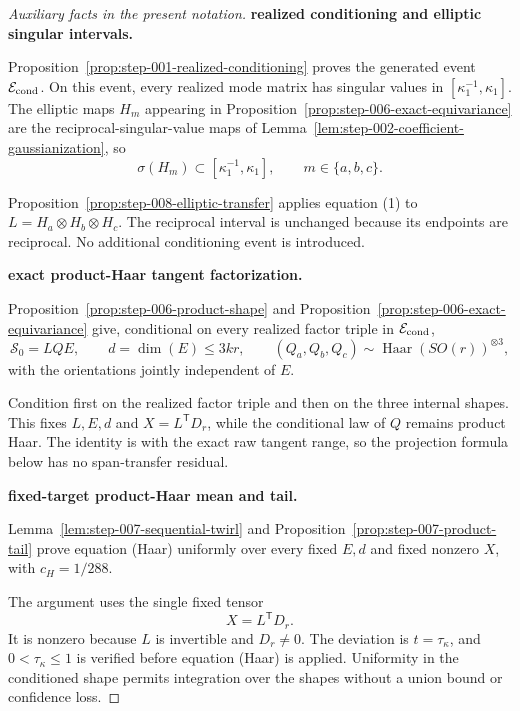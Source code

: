 \begin{proof}[Auxiliary facts in the present notation]


\medskip\noindent\textbf{realized conditioning and elliptic singular intervals.}\par

Proposition~\ref{prop:step-001-realized-conditioning} proves the generated
event \(\mathcal E_{\rm cond}\). On this event, every realized mode matrix has
singular values in \([\kappa_1^{-1},\kappa_1]\). The elliptic maps \(H_m\)
appearing in Proposition~\ref{prop:step-006-exact-equivariance} are the
reciprocal-singular-value maps of
Lemma~\ref{lem:step-002-coefficient-gaussianization}, so
\[
  \sigma(H_m)\subset[\kappa_1^{-1},\kappa_1],
  \qquad m\in\{a,b,c\}.
  \tag{1}
\]

Proposition~\ref{prop:step-008-elliptic-transfer}
applies equation (1) to
\(L=H_a\otimes H_b\otimes H_c\). The reciprocal interval is unchanged
because its endpoints are reciprocal. No additional conditioning event is
introduced.


\medskip\noindent\textbf{exact product-Haar tangent factorization.}\par

Proposition~\ref{prop:step-006-product-shape} and
Proposition~\ref{prop:step-006-exact-equivariance} give, conditional on every
realized factor triple in \(\mathcal E_{\rm cond}\),
\[
  \mathscr S_0=LQE,
  \qquad d=\dim(E)\le3kr,
  \qquad
  (Q_a,Q_b,Q_c)\sim\operatorname{Haar}(SO(r))^{\otimes3},
\]
with the orientations jointly independent of \(E\).

Condition first on the realized
factor triple and then on the three internal shapes. This fixes \(L,E,d\) and
\(X=L^{\mathsf T}D_r\), while the conditional law of \(Q\) remains product
Haar. The identity is with the exact raw tangent range, so the projection
formula below has no span-transfer residual.


\medskip\noindent\textbf{fixed-target product-Haar mean and tail.}\par

Lemma~\ref{lem:step-007-sequential-twirl} and
Proposition~\ref{prop:step-007-product-tail} prove equation (Haar) uniformly
over every fixed \(E,d\) and fixed nonzero \(X\), with \(c_H=1/288\).

The argument uses the single fixed tensor
\[
  X=L^{\mathsf T}D_r.
\]
It is nonzero because \(L\) is invertible and \(D_r\ne0\). The deviation is
\(t=\tau_\kappa\), and \(0<\tau_\kappa\le1\) is verified before equation
(Haar) is applied. Uniformity in the conditioned shape permits integration
over the shapes without a union bound or confidence loss.

\end{proof}



